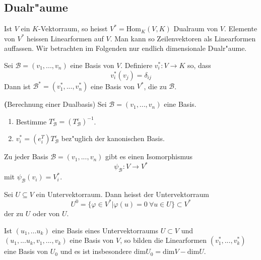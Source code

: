 \documentclass[9pt, a4paper, twocolumn, landscape]{article}
\newcommand{\comment}[1]{}
\begin{document}
\subsection{Dualr"aume}
\begin{definition}
Ist $V$ ein $K$-Vektorraum, so heisst $V^* = \mathrm{Hom}_K(V, K)$ Dualraum von $V$. Elemente von $V^*$ heissen Linearformen auf $V$. Man kann so Zeilenvektoren als Linearformen auffassen. Wir betrachten im Folgenden nur endlich dimensionale Dualr"aume.
\end{definition}


\begin{remark}
Sei $\mathcal{B} = (v_1, ..., v_n)$ eine Basis von $V$. Definiere $v_i^*: V \rightarrow K$ so, dass 
$$
v_i^*(v_j) = \delta_{ij}
$$
Dann ist $\mathcal{B}^* = (v^*_1, ..., v^*_n)$ eine Basis von $V^*$, die  zu $\mathcal{B}$.
\end{remark}


\begin{remark} \textbf({Berechnung einer Dualbasis)}
Sei $\mathcal{B} = (v_1, ..., v_n)$ eine Basis.
\begin{enumerate}
\item Bestimme $T^\varepsilon_\mathcal{B} = (T_\mathcal{B}^\varepsilon)^{-1}$. 
\item $v_i^* = \left(e_i^T \right) T^\varepsilon_\mathcal{B}$ bez"uglich der kanonischen Basis.
\end{enumerate}
\end{remark}


\comment{
\begin{corollary}
Sei $v \in V$ mit $v \neq 0$. Dann gibt es $\varphi \in V^*$, si dass $\varphi (v) \neq 0$.
\end{corollary}
}

\begin{corollary}
Zu jeder Basis $\mathcal{B} = (v_1, ..., v_n)$ gibt es einen Isomorphismus
$$
\psi_\mathcal{B} :V \rightarrow V^*
$$ 
mit $\psi_\mathcal{B}(v_i) = V^*_i$.
\end{corollary}
 
\begin{definition}
Sei $U \subseteq V$ ein Untervektorraum. Dann heisst der Untervektorraum
$$
U^0 = \{ \varphi \in V^* | \varphi(u) = 0 \ \forall u \in U \} \subset V^*
$$
der zu $U$  oder  von $U$.
\end{definition}

\begin{theorem}
Ist $(u_1, ... u_k)$ eine Basis eines Untervektorraums $U \subset V$ und $(u_1, ... u_k, v_1, ..., v_k)$ eine Basis von $V$, so bilden die Linearformen $(v_1^*, ..., v_k^*)$ eine Basis von $U_0$ und es ist insbesondere 
$
\mathrm{dim} U_0 = \mathrm{dim} V - \mathrm{dim} U.
$
\end{theorem}
 
\end{document}
